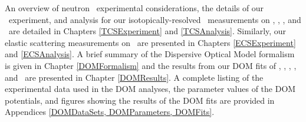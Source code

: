 An overview of neutron \tot\ experimental considerations, the details of our 
\tot\ experiment, and analysis for our isotopically-resolved \tot\ measurements
on \oSixEight, \niEightFour, \rhThree, and \snTwelveFour\ are detailed in 
Chapters \ref{TCSExperiment} and \ref{TCSAnalysis}. Similarly, our elastic scattering measurements 
on \snTwelveFour\ are presented in Chapters \ref{ECSExperiment} and \ref{ECSAnalysis}. A brief 
summary of the Dispersive Optical Model formalism is
given in Chapter \ref{DOMFormalism} and the results from our DOM fits of \oSixEight, 
\caAughtEight, \niEightFour, \snTwelveFour, and \pbEight\ are presented in Chapter \ref{DOMResults}. 
A complete listing of the experimental data used in the DOM analyses, the
parameter values of the DOM potentials, and figures showing the 
results of the DOM fits are provided in Appendices \ref{DOMDataSets,
DOMParameters, DOMFits}. 
